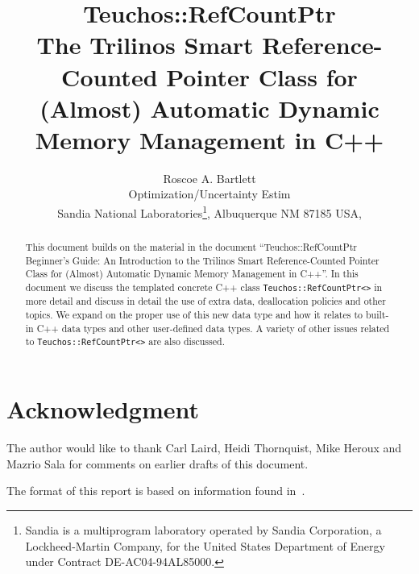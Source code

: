 \documentclass[pdf,ps2pdf,11pt]{SANDreport}
\title{\center
{\Huge\bf Teuchos::RefCountPtr}\\[1.5ex]
The Trilinos Smart Reference-Counted Pointer Class
for (Almost) Automatic Dynamic Memory Management in C++
}
\author{
Roscoe A. Bartlett \\ Optimization/Uncertainty Estim \\
Sandia National Laboratories\footnote{
Sandia is a multiprogram laboratory operated by Sandia Corporation, a
Lockheed-Martin Company, for the United States Department of Energy
under Contract DE-AC04-94AL85000.}, Albuquerque NM 87185 USA, \\
}
\date{}
\begin{document}
\raggedright

\maketitle

%

%
\begin{abstract}
%
This document builds on the material in the document
``Teuchos::RefCountPtr Beginner's Guide: An Introduction to the
Trilinos Smart Reference-Counted Pointer Class for (Almost) Automatic
Dynamic Memory Management in C++''.  In this document we discuss the
templated concrete C++ class {}\texttt{Teuchos::RefCountPtr<>} in more
detail and discuss in detail the use of extra data, deallocation
policies and other topics.  We expand on the proper use of this new
data type and how it relates to built-in C++ data types and other
user-defined data types.  A variety of other issues related to
\texttt{Teuchos::RefCountPtr<>} are also discussed.
%
\end{abstract}
%

%
\clearpage
\section*{Acknowledgment}
The author would like to thank Carl Laird, Heidi Thornquist, Mike
Heroux and Mazrio Sala for comments on earlier drafts of this
document.

The format of this report is based on information found
in~\cite{Sand98-0730}.

%
\clearpage
\tableofcontents
\listoffigures

\end{document}
